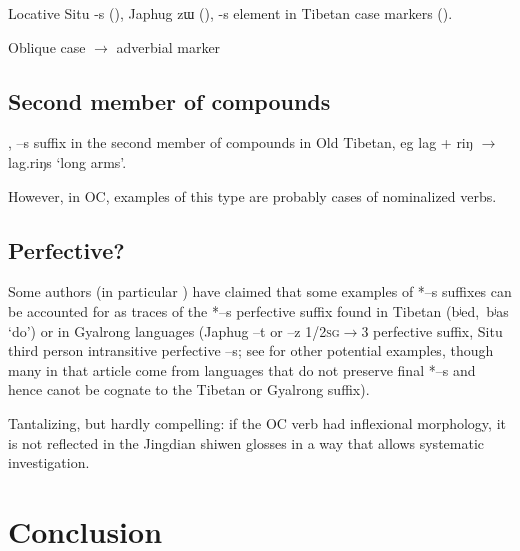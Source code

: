 \documentclass[oldfontcommands,oneside,a4paper,11pt]{article}
\newcommand{\ipa}[1]{{\phon \mbox{#1}}} %
\begin{document}
 
Locative Situ \ipa{-s} (\citealt{linxr93jiarong}), Japhug \ipa{zɯ} (\citealt[167-9]{jacques08zh}), \ipa{-s} element in Tibetan case markers (\citealt{hill12bas}).

Oblique case $\rightarrow$ adverbial marker


\subsection{Second member of compounds}


\citet{uebach08rjeblas}, \ipa{--s} suffix in the second member of compounds in Old Tibetan, eg \ipa{lag} + \ipa{riŋ} $\rightarrow$ \ipa{lag.riŋs} `long arms'.

 However, in OC, examples of this type are probably cases of nominalized verbs.
 
\subsection{Perfective?}
Some authors (in particular \citealt{jinlx06}) have claimed that some examples of *\ipa{--s} suffixes can be accounted for as traces of the *\ipa{--s} perfective suffix found in Tibetan (\ipa{bʲed, bʲas} `do') or in Gyalrong languages (Japhug \ipa{--t} or \ipa{--z} \textsc{1/2sg}$\rightarrow$3 perfective suffix, Situ third person intransitive perfective \ipa{--s}; see \citealt{huangbf97s.houzhui} for other potential examples, though many in that article come from languages that do not preserve final *\ipa{--s} and hence canot be cognate to the Tibetan or Gyalrong suffix).

Tantalizing, but hardly compelling: if the OC verb had inflexional morphology, it is not reflected in the Jingdian shiwen glosses in a way that allows systematic investigation.

\section{Conclusion}



\end{document}

